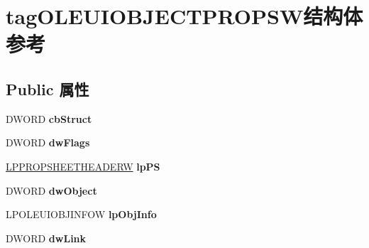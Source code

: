\hypertarget{structtag_o_l_e_u_i_o_b_j_e_c_t_p_r_o_p_s_w}{}\section{tag\+O\+L\+E\+U\+I\+O\+B\+J\+E\+C\+T\+P\+R\+O\+P\+S\+W结构体 参考}
\label{structtag_o_l_e_u_i_o_b_j_e_c_t_p_r_o_p_s_w}
\subsection*{Public 属性}
\begin{DoxyCompactItemize}
\item 
\mbox{\label{structtag_o_l_e_u_i_o_b_j_e_c_t_p_r_o_p_s_w_a606b28993559ad842b860e154c50bc2e}} 
D\+W\+O\+RD {\bfseries cb\+Struct}
\item 
\mbox{\label{structtag_o_l_e_u_i_o_b_j_e_c_t_p_r_o_p_s_w_a56ec65553fa6f1adbd20799b9741ee4f}} 
D\+W\+O\+RD {\bfseries dw\+Flags}
\item 
\mbox{\label{structtag_o_l_e_u_i_o_b_j_e_c_t_p_r_o_p_s_w_a4ed63c591a5061993499b68ef1715757}} 
\hyperlink{struct___p_r_o_p_s_h_e_e_t_h_e_a_d_e_r_w}{L\+P\+P\+R\+O\+P\+S\+H\+E\+E\+T\+H\+E\+A\+D\+E\+RW} {\bfseries lp\+PS}
\item 
\mbox{\label{structtag_o_l_e_u_i_o_b_j_e_c_t_p_r_o_p_s_w_a34cc40ffe4542caaf11b80ed3e97dfc0}} 
D\+W\+O\+RD {\bfseries dw\+Object}
\item 
\mbox{\label{structtag_o_l_e_u_i_o_b_j_e_c_t_p_r_o_p_s_w_a5a1d07155e0122c5a1d66e16ed5d90cf}} 
L\+P\+O\+L\+E\+U\+I\+O\+B\+J\+I\+N\+F\+OW {\bfseries lp\+Obj\+Info}
\item 
\mbox{\label{structtag_o_l_e_u_i_o_b_j_e_c_t_p_r_o_p_s_w_ab2f93ea09ced47130092d443fe99d61a}} 
D\+W\+O\+RD {\bfseries dw\+Link}
\item 
\mbox{\label{structtag_o_l_e_u_i_o_b_j_e_c_t_p_r_o_p_s_w_a0e5e37216e7a948d083ce72234ba7e78}} 

\end{DoxyCompactItemize}
